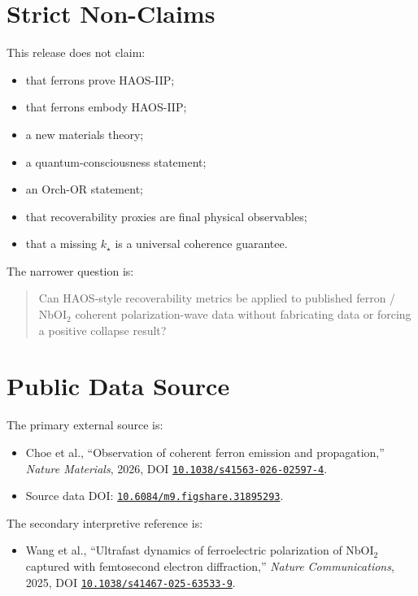 \documentclass[11pt]{article}
\begin{document}
\section{Strict Non-Claims}

This release does not claim:

\begin{itemize}
\item that ferrons prove HAOS-IIP;
\item that ferrons embody HAOS-IIP;
\item a new materials theory;
\item a quantum-consciousness statement;
\item an Orch-OR statement;
\item that recoverability proxies are final physical observables;
\item that a missing \(k_\star\) is a universal coherence guarantee.
\end{itemize}

The narrower question is:

\begin{quote}
Can HAOS-style recoverability metrics be applied to published ferron / NbOI$_2$ coherent polarization-wave data without fabricating data or forcing a positive collapse result?
\end{quote}

\section{Public Data Source}

The primary external source is:

\begin{itemize}
\item Choe et al., ``Observation of coherent ferron emission and propagation,'' \emph{Nature Materials}, 2026, DOI \href{https://doi.org/10.1038/s41563-026-02597-4}{\texttt{10.1038/s41563-026-02597-4}}.
\item Source data DOI: \href{https://doi.org/10.6084/m9.figshare.31895293}{\texttt{10.6084/m9.figshare.31895293}}.
\end{itemize}

The secondary interpretive reference is:

\begin{itemize}
\item Wang et al., ``Ultrafast dynamics of ferroelectric polarization of NbOI$_2$ captured with femtosecond electron diffraction,'' \emph{Nature Communications}, 2025, DOI \href{https://doi.org/10.1038/s41467-025-63533-9}{\texttt{10.1038/s41467-025-63533-9}}.
\end{itemize}
\end{document}
